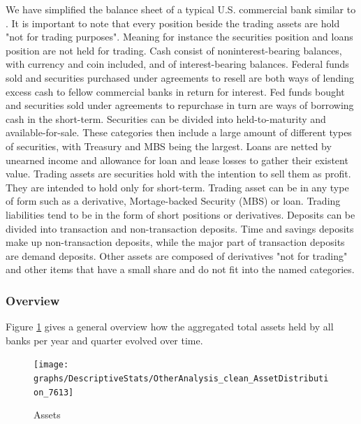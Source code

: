 \documentclass[12pt, a4paper]{article} %
\begin{document}
We have simplified the balance sheet of a typical U.S. commercial bank similar to \citet{DrechslerSchnabel2017}.
It is important to note that every position beside the trading assets are hold "not for trading purposes". Meaning for instance the securities position and loans position are not held for trading.
Cash consist of noninterest-bearing balances, with currency and coin included, and of interest-bearing balances.
Federal funds sold and securities purchased under agreements to resell are both ways of lending excess cash to fellow commercial banks in return for interest. Fed funds bought and securities sold under agreements to repurchase in turn are ways of borrowing cash in the short-term. Securities can be divided into held-to-maturity and available-for-sale. These categories then include a large amount of different types of securities, with Treasury and MBS being the largest. Loans are netted by unearned income and allowance for loan and lease losses to gather their existent value. Trading assets are securities hold with the intention to sell them as profit. They are intended to hold only for short-term. Trading asset can be in any type of form such as a derivative, Mortage-backed Security (MBS) or loan. Trading liabilities tend to be in the form of short positions or derivatives. Deposits can be divided into transaction and non-transaction deposits. Time and savings deposits make up non-transaction deposits, while the major part of transaction deposits are demand deposits. Other assets are composed of derivatives "not for trading" and other items that have a small share and do not fit into the named categories.
 
\subsubsection{Overview}
Figure \ref{fig:assets} gives a general overview how the aggregated total assets held by all banks per year and quarter evolved over time. 
 
\begin{figure}[H]
\begin{minipage}{\textwidth}
\texttt{[image: graphs/DescriptiveStats/OtherAnalysis\_clean\_AssetDistribution\_7613]}
\caption[1]{Assets}
\label{fig:assets}
\end{minipage}
\end{figure} 
 
\end{document}
